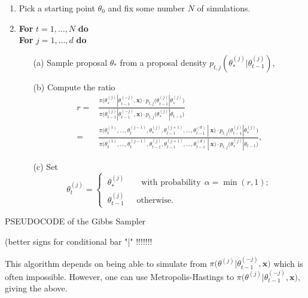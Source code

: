 \documentclass[11pt,a4paper,openany ]{book}
\begin{document}
\begin{algorithm}[H]
	\SetAlgoLined
	\begin{enumerate}
		\item Pick a starting point $\theta_0$ and fix some number $N$ of simulations.
		\item \textbf{For} $t=1,\dots,N$ \qquad \textbf{do} \\
		\quad \textbf{For} $j=1,\dots,d$ \qquad \textbf{do}
		\begin{itemize}
			\item[(a)] Sample proposal $\theta_*$ from a proposal density $p_{t,j}(\theta^{(j)}_*|\theta^{(j)}_{t-1})$,
			\item[(b)] Compute the ratio
			\begin{equation*}
			\begin{aligned}
				r = & \frac{\pi\Big(\theta^{(j)}_*|\theta_{t-1}^{(-j)},\boldsymbol{x}\Big)\cdot p_{t,j}\Big(\theta^{(j)}_{t-1}|\theta^{(j)}_*\Big)}{\pi\Big(\theta_{t-1}^{(j)}|\theta_{t-1}^{(-j)},\boldsymbol{x}\Big)\cdot p_{t,j}\Big(\theta^{(j)}_*|\theta_{t-1}\Big)} \\
				= & \frac{\pi\Big(\theta_t^{(1)},\dots,\theta_t^{(j-1)},\theta^{(j)}_*, \theta_{t-1}^{(j+1)},\dots,\theta_{t-1}^{(d)} \ | \ \boldsymbol{x}\Big)\cdot  p_{t,j}\Big(\theta_{t-1}^{(j)}|\theta_*^{(j)}\Big)}{\pi\Big(\theta_t^{(1)},\dots,\theta_t^{(j-1)},\theta^{(j)}_{t-1}, \theta_{t-1}^{(j+1)},\dots,\theta_{t-1}^{(d)}\ |\ \boldsymbol{x}\Big)\cdot  p_{t,j}\Big(\theta_{*}^{(j)}|\theta_{t-1}\Big)},
		\end{aligned}
			\end{equation*}
			\item[(c)] Set 
			\begin{equation*}
			\theta_t^{(j)}= 			\begin{cases} \ \theta_*^{(j)} \qquad \text{with probability} \ \  \alpha=\min (r,1); \\
			\ \theta_{t-1}^{(j)} \ \ \quad \text{otherwise}.
			\end{cases}
			\end{equation*}
		\end{itemize}
	\end{enumerate}
	\caption{PSEUDOCODE of the Gibbs Sampler}
\end{algorithm}
(better signs for conditional bar "|" !!!!!!!


This algorithm depends on being able to simulate from $\pi\Big(\theta^{(j)}|\theta_{t-1}^{(-j)},\boldsymbol{x}\Big)$ which is often impossible. However, one can use Metropolis-Hastings to $\pi\Big(\theta^{(j)}|\theta_{t-1}^{(-j)},\boldsymbol{x}\Big)$, giving the above.
\end{document}
